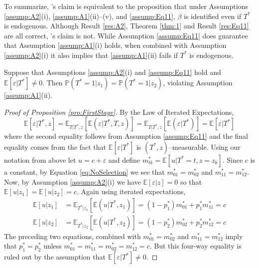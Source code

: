 To summarize, \citeauthor{Mahajan}'s claim is equivalent to the proposition that under Assumptions \ref{assump:A2}(i), \ref{assump:A1}(ii)--(v), and \ref{assump:Eq11}, $\beta$ is identified even if $T^*$ is endogenous.
Although Result \ref{res:A2}, Theorem \ref{thm:1} and Result \ref{res:Eq11} are all correct, \citeauthor{Mahajan}'s claim is not.
While Assumption \ref{assump:Eq11} does guarantee that Assumption \ref{assump:A1}(i) holds, when combined with Assumption \ref{assump:A2}(i) it also implies that \ref{assump:A1}(ii) fails if $T^*$ is endogenous.
\begin{pro}
  \label{pro:FirstStage}
  Suppose that Assumptions \ref{assump:A2}(i) and \ref{assump:Eq11} hold and $\mathbb{E}[\varepsilon|T^*]\neq0$. Then $\mathbb{P}(T^*=1|z_1) = \mathbb{P}(T^*=1|z_2)$, violating Assumption \ref{assump:A1}(ii). 
\end{pro}
\begin{proof}[Proof of Proposition \ref{pro:FirstStage}]
  By the Law of Iterated Expectations,
  \begin{equation}
    \label{eq:NoSelection}
    \mathbb{E}[\varepsilon|T^*,z] = \mathbb{E}_{T|T^*,z}\left[\mathbb{E}\left(\varepsilon|T^*,T,z \right)  \right] = \mathbb{E}_{T|T^*,z}\left[\mathbb{E}\left(\varepsilon|T^* \right)  \right]
    = \mathbb{E}\left[ \varepsilon|T^* \right]
  \end{equation}
    where the second equality follows from Assumption \ref{assump:Eq11} and the final equality comes from the fact that $\mathbb{E}[\varepsilon|T^*]$ is $(T^*,z)$--measurable. 
  Using our notation from above let $u = c + \varepsilon$ and define $m^*_{tk}=\mathbb{E}[u|T^*=t,z=z_k]$.
  Since $c$ is a constant, by Equation \ref{eq:NoSelection} we see that $m^*_{01}=m^*_{02}$ and $m^*_{11}=m^*_{12}$.
  Now, by Assumption \ref{assump:A2}(i) we have $\mathbb{E}[\varepsilon|z]=0$ so that $\mathbb{E}[u|z_1]= \mathbb{E}[u|z_2] =c$.
  Again using iterated expectations, 
  \begin{align*}
    \mathbb{E}\left[u|z_1 \right] &= \mathbb{E}_{T^*|z_1}\left[\mathbb{E}\left( u|T^*,z_1 \right)  \right] = (1-p_1^*) m^*_{01} + p^*_1 m^*_{11}=c\\
    \mathbb{E}\left[u|z_2 \right] &= \mathbb{E}_{T^*|z_2}\left[\mathbb{E}\left( u|T^*,z_2 \right)  \right] = (1-p_2^*) m^*_{02} + p^*_2 m^*_{12}=c
  \end{align*}
  The preceding two equations, combined with $m^*_{01}=m^*_{02}$ and $m^*_{11}=m^*_{12}$ imply that $p_1^* = p_2^*$ unless $m^*_{01} = m^*_{11} = m^*_{02} = m^*_{12} = c$.
  But this four-way equality is ruled out by the assumption that $\mathbb{E}[\varepsilon|T^*]\neq0$. 
\end{proof}


